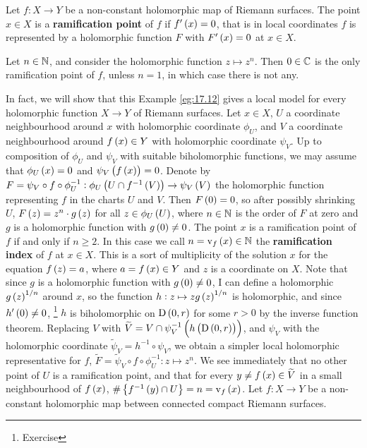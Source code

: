 \begin{definition}
Let $ f : X \to Y $ be a non-constant holomorphic map of Riemann surfaces. The point $ x \in X $ is a \textbf{ramification point} of $ f $ if $ f'\br{x} = 0 $, that is in local coordinates $ f $ is represented by a holomorphic function $ F $ with $ F'\br{x} = 0 $ at $ x \in X $.
\end{definition}

\pagebreak

\begin{example}
\label{eg:17.12}
Let $ n \in \mathbb{N} $, and consider the holomorphic function $ z \mapsto z^n $. Then $ 0 \in \mathbb{C} $ is the only ramification point of $ f $, unless $ n = 1 $, in which case there is not any.
\end{example}

In fact, we will show that this Example \ref{eg:17.12} gives a local model for every holomorphic function $ X \to Y $ of Riemann surfaces. Let $ x \in X $, $ U $ a coordinate neighbourhood around $ x $ with holomorphic coordinate $ \phi_U $, and $ V $ a coordinate neighbourhood around $ f\br{x} \in Y $ with holomorphic coordinate $ \psi_V $. Up to composition of $ \phi_U $ and $ \psi_V $ with suitable biholomorphic functions, we may assume that $ \phi_U\br{x} = 0 $ and $ \psi_V\br{f\br{x}} = 0 $. Denote by $ F = \psi_V \circ f \circ \phi_U^{-1} : \phi_U\br{U \cap f^{-1}\br{V}} \to \psi_V\br{V} $ the holomorphic function representing $ f $ in the charts $ U $ and $ V $. Then $ F\br{0} = 0 $, so after possibly shrinking $ U $, $ F\br{z} = z^n \cdot g\br{z} $ for all $ z \in \phi_U\br{U} $, where $ n \in \mathbb{N} $ is the order of $ F $ at zero and $ g $ is a holomorphic function with $ g\br{0} \ne 0 $. The point $ x $ is a ramification point of $ f $ if and only if $ n \ge 2 $. In this case we call $ n = \v_f\br{x} \in \NN $ the \textbf{ramification index} of $ f $ at $ x \in X $. This is a sort of multiplicity of the solution $ x $ for the equation $ f\br{z} = a $, where $ a = f\br{x} \in Y $ and $ z $ is a coordinate on $ X $. Note that since $ g $ is a holomorphic function with $ g\br{0} \ne 0 $, I can define a holomorphic $ g\br{z}^{1 / n} $ around $ x $, so the function $ h : z \mapsto zg\br{z}^{1 / n} $ is holomorphic, and since $ h'\br{0} \ne 0 $, \footnote{Exercise} $ h $ is biholomorphic on $ \D\br{0, r} $ for some $ r > 0 $ by the inverse function theorem. Replacing $ V $ with $ \widetilde{V} = V \cap \psi_V^{-1}\br{h\br{\D\br{0, r}}} $, and $ \psi_V $ with the holomorphic coordinate $ \widetilde{\psi}_V = h^{-1} \circ \psi_V $, we obtain a simpler local holomorphic representative for $ f $, $ \widetilde{F} = \widetilde{\psi}_V \circ f \circ \phi_U^{-1} : z \mapsto z^n $. We see immediately that no other point of $ U $ is a ramification point, and that for every $ y \ne f\br{x} \in \widetilde{V} $ in a small neighbourhood of $ f\br{x} $, $ \#\cbr{f^{-1}\br{y} \cap U} = n = \v_f\br{x} $. Let $ f : X \to Y $ be a non-constant holomorphic map between connected compact Riemann surfaces.

